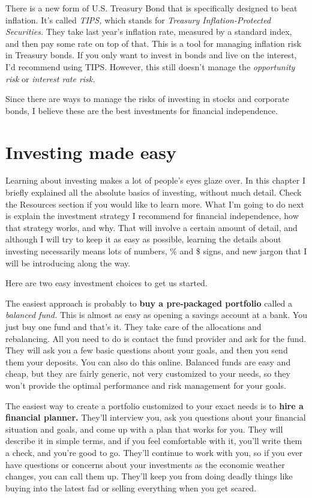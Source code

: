 There is a new form of U.S. Treasury Bond that is specifically designed to beat inflation. It's called \emph{TIPS,} which stands for \emph{Treasury Inflation-Protected Securities.} They take last year's inflation rate, measured by a standard index, and then pay some rate on top of that. This is a tool for managing inflation risk in Treasury bonds. If you only want to invest in bonds and live on the interest, I'd recommend using TIPS. However, this still doesn't manage the \emph{opportunity risk} or \emph{interest rate risk.}

Since there are ways to manage the risks of investing in stocks and corporate bonds, I believe these are the best investments for financial independence.

\section{Investing made easy}
Learning about investing makes a lot of people's eyes glaze over. In this chapter I briefly explained all the absolute basics of investing, without much detail. Check the Resources section if you would like to learn more. What I'm going to do next is explain the investment strategy I recommend for financial independence, how that strategy works, and why. That will involve a certain amount of detail, and although I will try to keep it as easy as possible, learning the details about investing necessarily means lots of numbers, \% and \$ signs, and new jargon that I will be introducing along the way.

Here are two easy investment choices to get us started.

The easiest approach is probably to \textbf{buy a pre-packaged portfolio} called a \emph{balanced fund.} This is almost as easy as opening a savings account at a bank. You just buy one fund and that's it. They take care of the allocations and rebalancing. All you need to do is contact the fund provider and ask for the fund. They will ask you a few basic questions about your goals, and then you send them your deposits. You can also do this online. Balanced funds are easy and cheap, but they are fairly generic, not very customized to your needs, so they won't provide the optimal performance and risk management for your goals.

The easiest way to create a portfolio customized to your exact needs is to \textbf{hire a financial planner.} They'll interview you, ask you questions about your financial situation and goals, and come up with a plan that works for you. They will describe it in simple terms, and if you feel comfortable with it, you'll write them a check, and you're good to go. They'll continue to work with you, so if you ever have questions or concerns about your investments as the economic weather changes, you can call them up. They'll keep you from doing deadly things like buying into the latest fad or selling everything when you get scared.

